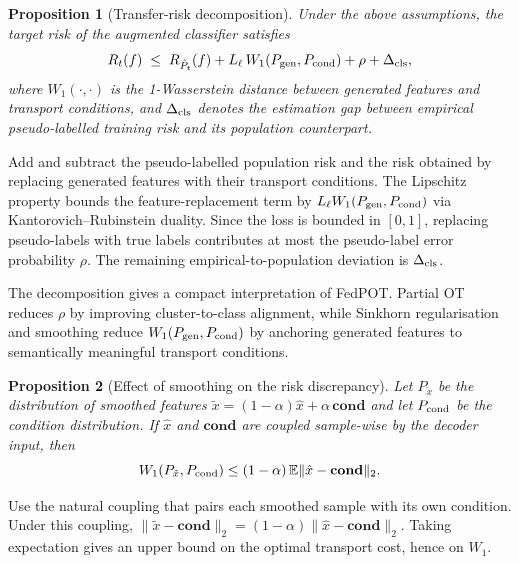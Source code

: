 \documentclass[a4paper,fleqn]{cas-sc}
\newtheorem{proposition}{Proposition}
\begin{document}
\begin{proposition}[Transfer-risk decomposition]
  Under the above assumptions, the target risk of the augmented classifier
  satisfies
  \begin{equation}
    R_t(f) \;\leq\; R_{\hat P_t}(f)
    + L_\ell\,W_1(P_{\rm gen},P_{\rm cond}) + \rho
    + \Delta_{\rm cls},
    \label{eq:risk_bound}
  \end{equation}
  where $W_1(\cdot,\cdot)$ is the 1-Wasserstein distance between generated
  features and transport conditions, and $\Delta_{\rm cls}$ denotes the
  estimation gap between empirical pseudo-labelled training risk and its
  population counterpart.
  \label{prop:risk}
\end{proposition}

\begin{pf}
  Add and subtract the pseudo-labelled population risk and the risk obtained
  by replacing generated features with their transport conditions. The
  Lipschitz property bounds the feature-replacement term by
  $L_\ell W_1(P_{\rm gen},P_{\rm cond})$ via Kantorovich--Rubinstein duality.
  Since the loss is bounded in $[0,1]$, replacing pseudo-labels with true
  labels contributes at most the pseudo-label error probability $\rho$.
  The remaining empirical-to-population deviation is $\Delta_{\rm cls}$.
\end{pf}

The decomposition gives a compact interpretation of FedPOT. Partial OT reduces
$\rho$ by improving cluster-to-class alignment, while Sinkhorn regularisation
and smoothing reduce $W_1(P_{\rm gen},P_{\rm cond})$ by anchoring generated
features to semantically meaningful transport conditions.

\begin{proposition}[Effect of smoothing on the risk discrepancy]
  Let $P_{\tilde x}$ be the distribution of smoothed features
  $\tilde x=(1-\alpha)\hat x+\alpha\,\mathbf{cond}$ and let
  $P_{\rm cond}$ be the condition distribution. If $\hat x$ and
  $\mathbf{cond}$ are coupled sample-wise by the decoder input, then
  \begin{equation}
    W_1(P_{\tilde x},P_{\rm cond})
    \leq (1-\alpha)\,
    \mathbb{E}\|\hat x-\mathbf{cond}\|_2.
    \label{eq:smooth_wasserstein}
  \end{equation}
  \label{prop:smooth_risk}
\end{proposition}

\begin{pf}
  Use the natural coupling that pairs each smoothed sample with its own
  condition. Under this coupling,
  $\|\tilde x-\mathbf{cond}\|_2
  =(1-\alpha)\|\hat x-\mathbf{cond}\|_2$. Taking expectation gives an upper
  bound on the optimal transport cost, hence on $W_1$.
\end{pf}
\end{document}
